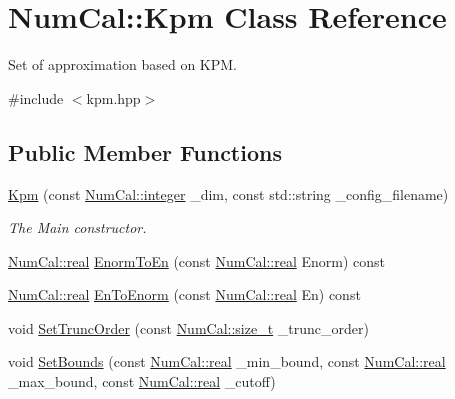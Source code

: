 \hypertarget{classNumCal_1_1Kpm}{\section{Num\+Cal\+:\+:Kpm Class Reference}
\label{classNumCal_1_1Kpm}
}


Set of approximation based on K\+P\+M.  




{\ttfamily \#include $<$kpm.\+hpp$>$}

\subsection*{Public Member Functions}
\begin{DoxyCompactItemize}
\item 
\hyperlink{classNumCal_1_1Kpm_acf83fa2ec653af132be07bb6c051fb73}{Kpm} (const \hyperlink{namespaceNumCal_ae1031b42812e871d8f5bd9b7b15fc7d8}{Num\+Cal\+::integer} \+\_\+dim, const std\+::string \+\_\+config\+\_\+filename)
\begin{DoxyCompactList}\small\item\em The Main constructor. \end{DoxyCompactList}\item 
\hyperlink{namespaceNumCal_ac10564761316cff6fb75fe8bfccd6def}{Num\+Cal\+::real} \hyperlink{classNumCal_1_1Kpm_a517de39295cd1ea3cbc0e82ae9d98c77}{Enorm\+To\+En} (const \hyperlink{namespaceNumCal_ac10564761316cff6fb75fe8bfccd6def}{Num\+Cal\+::real} Enorm) const 
\item 
\hyperlink{namespaceNumCal_ac10564761316cff6fb75fe8bfccd6def}{Num\+Cal\+::real} \hyperlink{classNumCal_1_1Kpm_aa2e2741cf305dd5a80fe0adac014b65b}{En\+To\+Enorm} (const \hyperlink{namespaceNumCal_ac10564761316cff6fb75fe8bfccd6def}{Num\+Cal\+::real} En) const 
\item 
void \hyperlink{classNumCal_1_1Kpm_ae5baa0e8d9a4dd8559b3873cd52b7bee}{Set\+Trunc\+Order} (const \hyperlink{namespaceNumCal_aa3e2bbd7c48c91db220faeb896cd15a4}{Num\+Cal\+::size\+\_\+t} \+\_\+trunc\+\_\+order)
\item 
void \hyperlink{classNumCal_1_1Kpm_a2427f17b0ca2959c046e4613a474b18e}{Set\+Bounds} (const \hyperlink{namespaceNumCal_ac10564761316cff6fb75fe8bfccd6def}{Num\+Cal\+::real} \+\_\+min\+\_\+bound, const \hyperlink{namespaceNumCal_ac10564761316cff6fb75fe8bfccd6def}{Num\+Cal\+::real} \+\_\+max\+\_\+bound, const \hyperlink{namespaceNumCal_ac10564761316cff6fb75fe8bfccd6def}{Num\+Cal\+::real} \+\_\+cutoff)

\end{DoxyCompactItemize}
